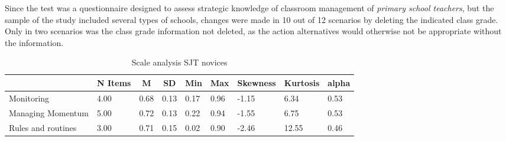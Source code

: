 \documentclass[
  man]{apa6}
\begin{document}
Since the test was a questionnaire designed to assess strategic knowledge of classroom management of \emph{primary school teachers}, but the sample of the study included several types of schools, changes were made in 10 out of 12 scenarios by deleting the indicated class grade. Only in two scenarios was the class grade information not deleted, as the action alternatives would otherwise not be appropriate without the information.

\begin{table}[h]

\begin{center}
\begin{threeparttable}

\caption{\label{tab:sjt}Scale analysis SJT novices}

\tiny{

\begin{tabular}{lllllllll}
\toprule
 & \multicolumn{1}{c}{N Items} & \multicolumn{1}{c}{M} & \multicolumn{1}{c}{SD} & \multicolumn{1}{c}{Min} & \multicolumn{1}{c}{Max} & \multicolumn{1}{c}{Skewness} & \multicolumn{1}{c}{Kurtosis} & \multicolumn{1}{c}{alpha}\\
\midrule
Monitoring & 4.00 & 0.68 & 0.13 & 0.17 & 0.96 & -1.15 & 6.34 & 0.53\\
Managing Momentum & 5.00 & 0.72 & 0.13 & 0.22 & 0.94 & -1.55 & 6.75 & 0.53\\
Rules and routines & 3.00 & 0.71 & 0.15 & 0.02 & 0.90 & -2.46 & 12.55 & 0.46\\
\bottomrule
\end{tabular}

}

\end{threeparttable}
\end{center}

\end{table}
\end{document}
